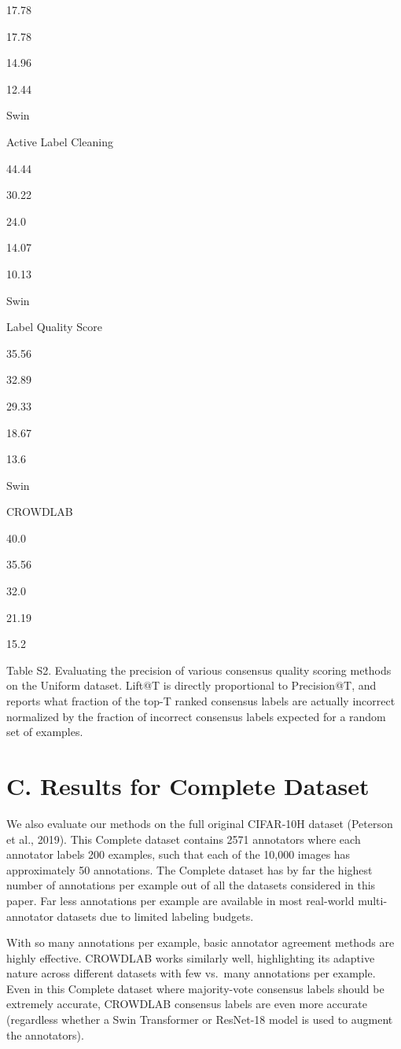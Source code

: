 \documentclass[
]{article}
\begin{document}
17.78

17.78

14.96

12.44

Swin

Active Label Cleaning

44.44

30.22

24.0

14.07

10.13

Swin

Label Quality Score

35.56

32.89

29.33

18.67

13.6

Swin

CROWDLAB

40.0

35.56

32.0

21.19

15.2

Table S2. Evaluating the precision of various consensus quality scoring
methods on the Uniform dataset. Lift@T is directly proportional to
Precision@T, and reports what fraction of the top-T ranked consensus
labels are actually incorrect normalized by the fraction of incorrect
consensus labels expected for a random set of examples.

\section{C. Results for Complete
Dataset}\label{c.-results-for-complete-dataset}

We also evaluate our methods on the full original CIFAR-10H dataset
(Peterson et al., 2019). This Complete dataset contains 2571 annotators
where each annotator labels 200 examples, such that each of the 10,000
images has approximately 50 annotations. The Complete dataset has by far
the highest number of annotations per example out of all the datasets
considered in this paper. Far less annotations per example are available
in most real-world multi-annotator datasets due to limited labeling
budgets.

With so many annotations per example, basic annotator agreement methods
are highly effective. CROWDLAB works similarly well, highlighting its
adaptive nature across different datasets with few vs.~many annotations
per example. Even in this Complete dataset where majority-vote consensus
labels should be extremely accurate, CROWDLAB consensus labels are even
more accurate (regardless whether a Swin Transformer or ResNet-18 model
is used to augment the annotators).
\end{document}
